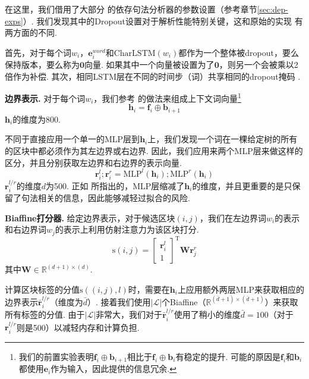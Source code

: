 在这里，我们借用了大部分 \citet{dozat-etal-2017-biaffine}的依存句法分析器的参数设置（参考章节\ref{sec:dep-exps}）.
我们发现其中的Dropout设置对于解析性能特别关键，这和原始的实现 \citep{stern-etal-2017-minimal}有两方面的不同.

首先，对于每个词$w_i$，$\mathbf{e}^{word}_i$和$\mathrm{CharLSTM}(w_i)$都作为一个整体被dropout，要么保持版本，要么称为$\mathbf{0}$向量.
如果其中一个向量被设置为了$\mathbf{0}$，则另一个会被乘以2倍作为补偿.
其次，相同LSTM层在不同的时间步（词）共享相同的dropout掩码 \citep{yarin-etal-2016-dropout}.

\noindent\textbf{边界表示.}
对于每个词$w_i$，我们参考 \citet{stern-etal-2017-minimal}的做法来组成上下文词向量\footnote{我们的前置实验表明$\mathbf{f}_i \oplus \mathbf{b}_{i+1}$相比于$\mathbf{f}_i \oplus \mathbf{b}_i$有稳定的提升.
	可能的原因是$\mathbf{f}_i$和$\mathbf{b}_i$都使用$\mathbf{e}_i$作为输入，因此提供的信息冗余.}
\begin{equation}
	\mathbf{h}_i = \mathbf{f}_i \oplus \mathbf{b}_{i+1}
\end{equation}
$\mathbf{h}_i$的维度为800.

不同于直接应用一个单一的MLP层到$\mathbf{h}_i$上，我们发现一个词在一棵给定树的所有的区块中都必须作为其左边界或右边界.
因此，我们应用来两个MLP层来做这样的区分，并且分别获取左边界和右边界的表示向量.
\begin{equation}
	\label{mlp-boundaries}
	\mathbf{r}_i^{l}; \mathbf{r}_i^{r} =\mathrm{MLP}^{l} \left( \mathbf{h}_i \right); \mathrm{MLP}^{r} \left( \mathbf{h}_i \right)
\end{equation}
$\mathbf{r}_i^{l/r}$的维度$d$为500.
正如 \citet{dozat-etal-2017-biaffine}所指出的，MLP层缩减了$\mathbf{h}_i$的维度，并且更重要的是只保留了句法相关的信息，因此能够减轻过拟合的风险.

\noindent\textbf{Biaffine打分器.}
给定边界表示，对于候选区块$(i,j)$，我们在左边界词$w_i$的表示和右边界词$w_j$的表示上利用仿射注意力为该区块打分.
\begin{equation} \label{eq:con-biaffine}
	\mathrm{s}(i,j) =  \left[
		\begin{array}{c}
			\mathbf{r}_{i}^{l} \\
			1
		\end{array}
		\right]^\mathrm{T}
	\mathbf{W} \mathbf{r}_{j}^{r}
\end{equation}
其中$\mathbf{W} \in \mathbb{R}^{(d+1) \times (d)}$.

计算区块标签的分值$\mathrm{s}((i,j),l)$时，需要在$\mathbf{h}_i$上应用额外两层MLP来获取相应的边界表示$\bar{\mathbf{r}}^{l/r}_i$（维度为$\bar{d}$）.
接着我们使用$|\mathcal{L}|$个Biaffine（$\mathbb{R}^{(\bar{d}+1) \times (\bar{d}+1)}$）来获取所有标签的分值.
由于$|\mathcal{L}|$非常大，我们对于$\bar{\mathbf{r}}^{l/r}_i$使用了稍小的维度$\bar{d}=100$（对于${\mathbf{r}}^{l/r}_i$则是500）以减轻内存和计算负担.

